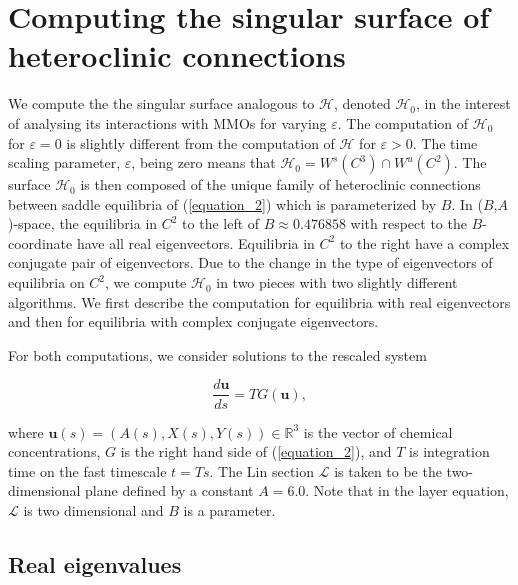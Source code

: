 \documentclass{ws-ijbc}
\begin{document}

\section{Computing the singular surface of heteroclinic connections}

We compute the the singular surface analogous to $\mathscr{H}$, denoted $\mathscr{H}_0$, in the interest of analysing its interactions with MMOs for varying $\varepsilon$.  The computation of $\mathscr{H}_0$ for $\varepsilon=0$ is slightly different from the computation of $\mathscr{H}$ for $\varepsilon > 0$.  The time scaling parameter, $\varepsilon$, being zero means that $\mathscr{H}_0 = W^s(C^3) \cap W^u(C^2)$.  The surface $\mathscr{H}_0$ is then composed of the unique family of heteroclinic connections between saddle equilibria of (\ref{equation_2}) which is parameterized by $B$.  In ($B$,$A$)-space, the equilibria in $C^2$ to the left of $B \approx 0.476858$ with respect to the $B$-coordinate have all real eigenvectors.  Equilibria in $C^2$ to the right have a complex conjugate pair of eigenvectors.  Due to the change in the type of eigenvectors of equilibria on $C^2$, we compute $\mathscr{H}_0$ in two pieces with two slightly different algorithms.  We first describe the computation for equilibria with real eigenvectors and then for equilibria with complex conjugate eigenvectors.  

For both computations, we consider solutions to the rescaled system

\begin{equation}
\frac{d\mathbf{u}}{ds} = TG(\mathbf{u}),
\label{fast_rescale}
\end{equation}

\noindent
where $\mathbf{u}(s) = (A(s), X(s), Y(s)) \in \mathbb{R}^3$ is the vector of chemical concentrations, $G$ is the right hand side of (\ref{equation_2}), and $T$ is integration time on the fast timescale $t=Ts$.  The Lin section $\mathscr{L}$ is taken to be the two-dimensional plane defined by a constant $A=6.0$.  Note that in the layer equation, $\mathscr{L}$ is two dimensional and $B$ is a parameter.

\subsection{Real eigenvalues}
\end{document}
